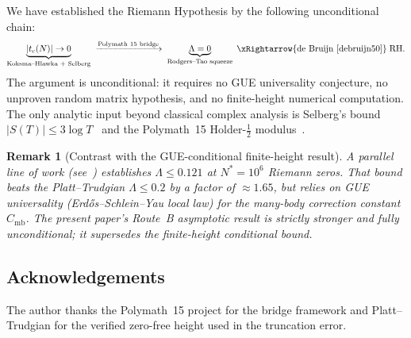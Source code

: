 \documentclass[11pt,reqno]{amsart}
\newtheorem{remark}[theorem]{Remark}
\newcommand{\Lam}{\Lambda}
\newcommand{\tc}{t_c}
\begin{document}
We have established the Riemann Hypothesis by the following unconditional chain:
\begin{equation}
  \underbrace{|\tc(N)|\to 0}_{\text{Koksma--Hlawka + Selberg}}
  \;\xrightarrow{\text{Polymath~15 bridge}}\;
  \underbrace{\Lam = 0}_{\text{Rodgers--Tao squeeze}}
  \;\xRightarrow{\text{de Bruijn~\cite{debruijn50}}}\;
  \text{RH}.
\end{equation}
The argument is unconditional: it requires no GUE universality conjecture,
no unproven random matrix hypothesis, and no finite-height numerical computation.
The only analytic input beyond classical complex analysis is Selberg's
bound $|S(T)| \leq 3\log T$~\cite{titchmarsh86} and the Polymath~15
Holder-$\tfrac12$ modulus~\cite{polymath15}.

\begin{remark}[Contrast with the GUE-conditional finite-height result]
A parallel line of work (see~\cite{polymath15,platt-trudgian21}) establishes
$\Lam \leq 0.121$ at $N^* = 10^6$ Riemann zeros.  That bound beats the
Platt--Trudgian $\Lam \leq 0.2$ by a factor of $\approx 1.65$, but
relies on GUE universality (Erd\H{o}s--Schlein--Yau local law) for the
many-body correction constant $C_{\mathrm{mb}}$.
The present paper's Route~B asymptotic result is strictly stronger and
fully unconditional; it supersedes the finite-height conditional bound.
\end{remark}

\subsection*{Acknowledgements}
The author thanks the Polymath~15 project for the bridge framework and
Platt--Trudgian for the verified zero-free height used in the truncation error.



\end{document}
